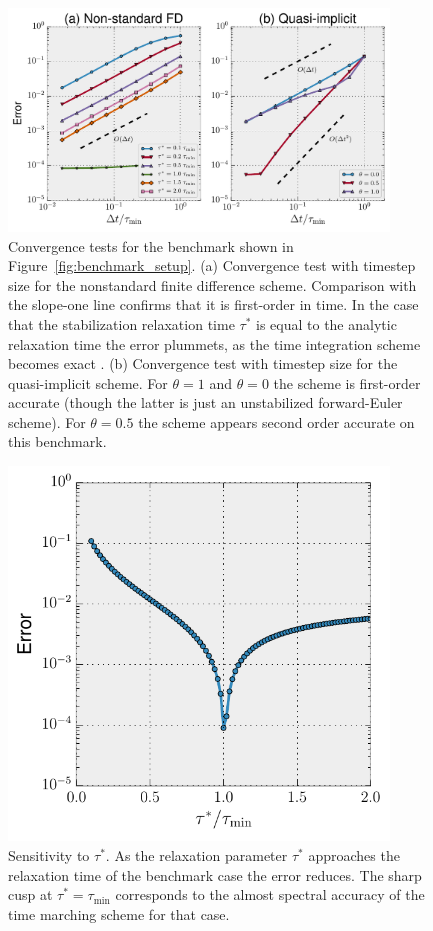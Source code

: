 \documentclass[preprint,12pt,authoryear]{elsarticle}
\begin{document}
\begin{figure}
\includegraphics[width=0.9\textwidth]{figures/timestep_convergence.pdf}
\caption{Convergence tests for the benchmark shown in Figure~\ref{fig:benchmark_setup}. (a) Convergence test with timestep size for the nonstandard finite difference scheme. Comparison with the slope-one line confirms that it is first-order in time. In the case that the stabilization relaxation time $\tau^*$ is equal to the analytic relaxation time the error plummets, as the time integration scheme becomes exact \citep{mickens2002nonstandard}. (b) Convergence test with timestep size for the quasi-implicit scheme. For $\theta = 1$ and $\theta = 0$ the scheme is first-order accurate (though the latter is just an unstabilized forward-Euler scheme). For $\theta=0.5$ the scheme appears second order accurate on this benchmark.}
\label{fig:timestep_convergence}
\end{figure}

\begin{figure}
\includegraphics[width=0.9\textwidth]{figures/tau_sensitivity.pdf}
\caption{Sensitivity to $\tau^*$. As the relaxation parameter $\tau^*$ approaches the relaxation time of the benchmark case the error reduces. The sharp cusp at $\tau^* = \tau_\mathrm{min}$ corresponds to the almost spectral accuracy of the time marching scheme for that case.}
\label{fig:tau_sensitivity}
\end{figure}
\end{document}
